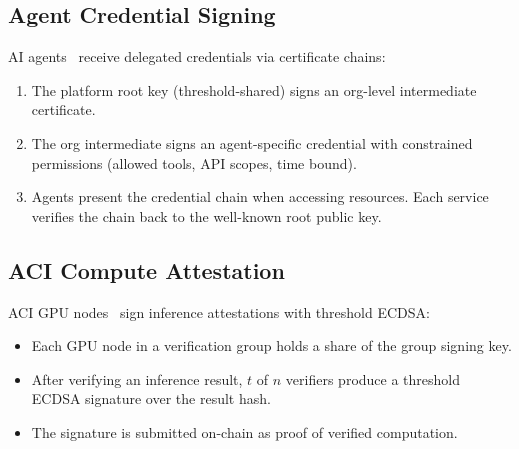 \subsection{Agent Credential Signing}

AI agents~\cite{hanzoagentsdk} receive delegated credentials via certificate
chains:
\begin{enumerate}[leftmargin=1.4em]
    \item The platform root key (threshold-shared) signs an org-level
    intermediate certificate.
    \item The org intermediate signs an agent-specific credential with
    constrained permissions (allowed tools, API scopes, time bound).
    \item Agents present the credential chain when accessing resources. Each
    service verifies the chain back to the well-known root public key.
\end{enumerate}

\subsection{ACI Compute Attestation}

ACI GPU nodes~\cite{hanzoaci} sign inference attestations with threshold ECDSA:
\begin{itemize}[leftmargin=1.1em]
    \item Each GPU node in a verification group holds a share of the group
    signing key.
    \item After verifying an inference result, $t$ of $n$ verifiers produce a
    threshold ECDSA signature over the result hash.
    \item The signature is submitted on-chain as proof of verified computation.
\end{itemize}

